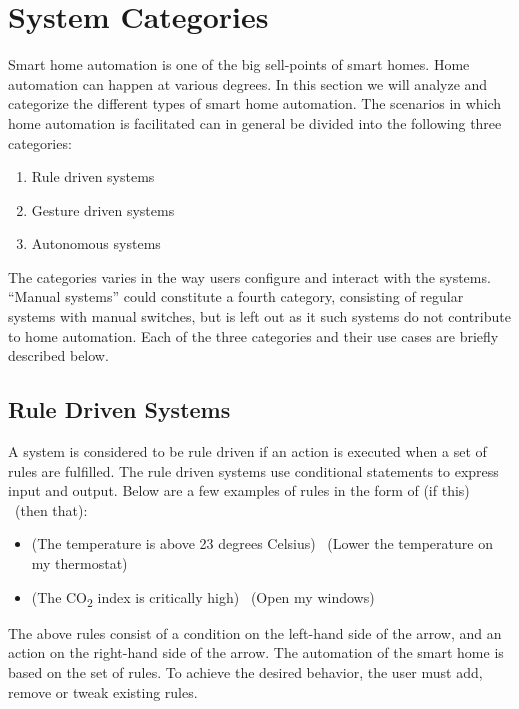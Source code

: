 \section{System Categories}\label{sec:system-categories}
Smart home automation is one of the big sell-points of smart homes.
Home automation can happen at various degrees. 
In this section we will analyze and categorize the different types of smart home automation. 
The scenarios in which home automation is facilitated can in general be divided into the following three categories:

\begin{enumerate}
    \item Rule driven systems
    \item Gesture driven systems
    \item Autonomous systems
\end{enumerate}

The categories varies in the way users configure and interact with the systems. 
``Manual systems'' could constitute a fourth category, consisting of regular systems with manual switches,
but is left out as it such systems do not contribute to home automation.
Each of the three categories and their use cases are briefly described below.

\subsection{Rule Driven Systems}

A system is considered to be rule driven if an action is executed when a set of rules are fulfilled. 
The rule driven systems use conditional statements to express input and output. 
Below are a few examples of rules in the form of (if this) \textrightarrow~(then that):

\begin{itemize}
    \item (The temperature is above 23 degrees Celsius) \textrightarrow~(Lower the temperature on my thermostat)
    \item (The CO\textsubscript{2} index is critically high) \textrightarrow~(Open my windows)
\end{itemize}

The above rules consist of a condition on the left-hand side of the arrow, 
and an action on the right-hand side of the arrow.
The automation of the smart home is based on the set of rules. 
To achieve the desired behavior, the user must add, remove or tweak existing rules.

